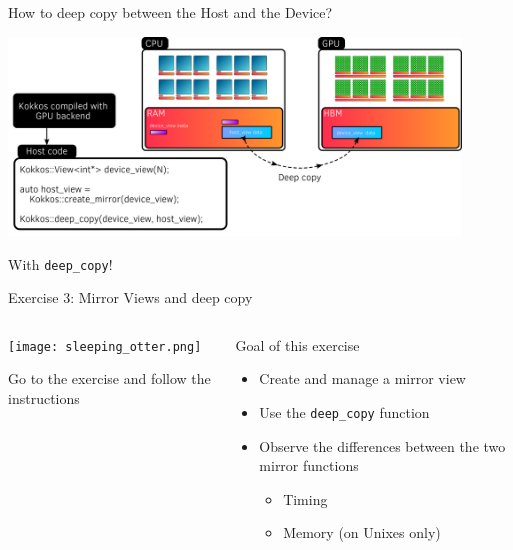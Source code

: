 \documentclass[aspectratio=169]{beamer}
\begin{document}

\begin{frame}{How to deep copy between the Host and the Device?}
    \begin{center}
        \includegraphics[width=0.9\textwidth]{host_device_deep_copy.png}
    \end{center}

     With \texttt{deep\_copy}!
\end{frame}


\begin{exerciseframe}{Exercise 3: Mirror Views and deep copy}
    \begin{columns}
        \begin{column}{0.5\linewidth}
            \begin{center}
                \texttt{[image: sleeping\_otter.png]}
            \end{center}

            Go to the exercise  and follow the instructions
        \end{column}
        \begin{column}{0.5\linewidth}
            \begin{block}{Goal of this exercise}
                \begin{itemize}
                    \item Create and manage a mirror view
                    \item Use the \texttt{deep\_copy} function
                    \item Observe the differences between the two mirror functions
                    \begin{itemize}
                        \item Timing
                        \item Memory (on Unixes only)
                    \end{itemize}
                \end{itemize}
            \end{block}
        \end{column}
    \end{columns}
\end{exerciseframe}
\end{document}
